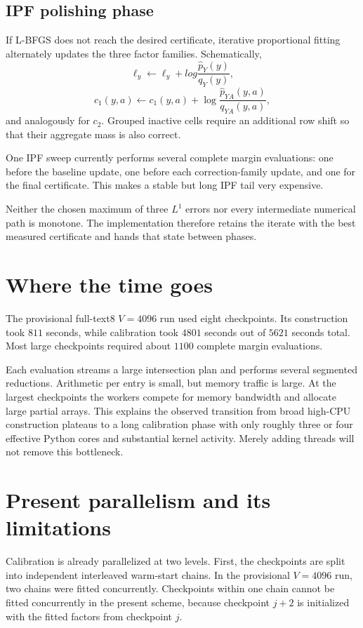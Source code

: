 \documentclass[11pt]{article}
\begin{document}
\subsection{IPF polishing phase}

If L-BFGS does not reach the desired certificate, iterative proportional
fitting alternately updates the three factor families.  Schematically,
\[
 \ell_y\leftarrow\ell_y+log\frac{\widehat p_Y(y)}{q_Y(y)},
\]
\[
 c_1(y,a)\leftarrow c_1(y,a)
   +\log\frac{\widehat p_{YA}(y,a)}{q_{YA}(y,a)},
\]
and analogously for $c_2$.  Grouped inactive cells require an additional
row shift so that their aggregate mass is also correct.

One IPF sweep currently performs several complete margin evaluations: one
before the baseline update, one before each correction-family update, and
one for the final certificate.  This makes a stable but long IPF tail very
expensive.

Neither the chosen maximum of three $L^1$ errors nor every intermediate
numerical path is monotone.  The implementation therefore retains the
iterate with the best measured certificate and hands that state between
phases.

\section{Where the time goes}

The provisional full-text8 $V=4096$ run used eight checkpoints.  Its
construction took $811$ seconds, while calibration took $4801$ seconds out
of $5621$ seconds total.  Most large checkpoints required about $1100$
complete margin evaluations.

Each evaluation streams a large intersection plan and performs several
segmented reductions.  Arithmetic per entry is small, but memory traffic is
large.  At the largest checkpoints the workers compete for memory bandwidth
and allocate large partial arrays.  This explains the observed transition
from broad high-CPU construction plateaus to a long calibration phase with
only roughly three or four effective Python cores and substantial kernel
activity.  Merely adding threads will not remove this bottleneck.

\section{Present parallelism and its limitations}

Calibration is already parallelized at two levels.  First, the checkpoints
are split into independent interleaved warm-start chains.  In the provisional
$V=4096$ run, two chains were fitted concurrently.  Checkpoints within one
chain cannot be fitted concurrently in the present scheme, because checkpoint
$j+2$ is initialized with the fitted factors from checkpoint $j$.
\end{document}
